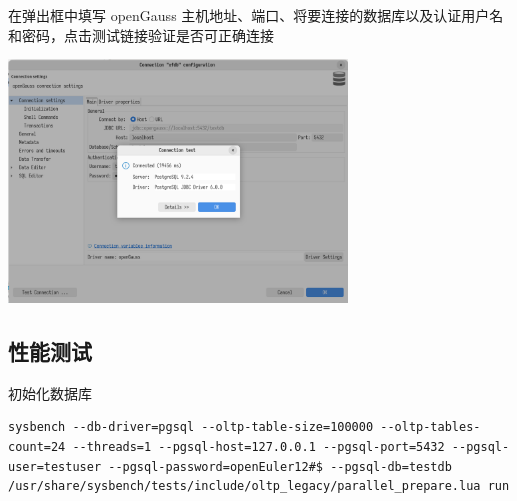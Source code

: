 \documentclass{article}
\begin{document}
在弹出框中填写 openGauss 主机地址、端口、将要连接的数据库以及认证用户名和密码，点击测试链接验证是否可正确连接

\begin{center}
\includegraphics[width=9cm]{./image/5.png}
\end{center}


\subsection{性能测试}

初始化数据库
\begin{verbatim}
sysbench --db-driver=pgsql --oltp-table-size=100000 --oltp-tables-count=24 --threads=1 --pgsql-host=127.0.0.1 --pgsql-port=5432 --pgsql-user=testuser --pgsql-password=openEuler12#$ --pgsql-db=testdb  /usr/share/sysbench/tests/include/oltp_legacy/parallel_prepare.lua run
\end{verbatim}
\end{document}
